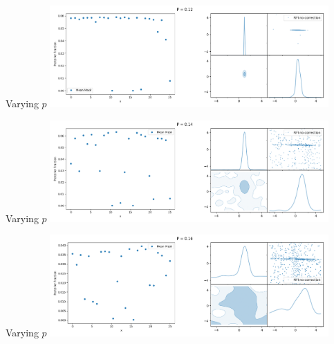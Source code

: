 \documentclass[aspectratio=169]{beamer}
\begin{document}
\begin{frame}{Varying $p$}
    \centering
    \includegraphics[width=0.8\textwidth]{images/gif_anest/comb_7.png}
\end{frame}

\begin{frame}{Varying $p$}
    \centering
    \includegraphics[width=0.8\textwidth]{images/gif_anest/comb_8.png}
\end{frame}

\begin{frame}{Varying $p$}
    \centering
    \includegraphics[width=0.8\textwidth]{images/gif_anest/comb_9.png}
\end{frame}
\end{document}
